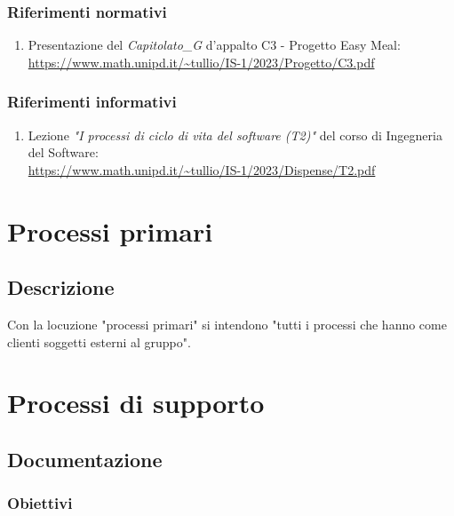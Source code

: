 \documentclass[12pt, oneside]{article}
\begin{document}
\subsubsection{Riferimenti normativi}
\begin{enumerate}
    \item Presentazione del \textit{Capitolato_G} d'appalto C3 - Progetto Easy Meal: \\ \url{https://www.math.unipd.it/~tullio/IS-1/2023/Progetto/C3.pdf}
\end{enumerate}
\subsubsection{Riferimenti informativi}
\begin{enumerate}
    \item Lezione \emph{"I processi di ciclo di vita del software (T2)"} del corso di Ingegneria del Software: \\
    \url{https://www.math.unipd.it/~tullio/IS-1/2023/Dispense/T2.pdf}
\end{enumerate}
\newpage

\section{Processi primari}
\subsection{Descrizione}
Con la locuzione "processi primari" si intendono "tutti i processi che hanno come clienti soggetti esterni al gruppo". \\

\newpage

\section{Processi di supporto}
\subsection{Documentazione}
\subsubsection{Obiettivi}
\end{document}
